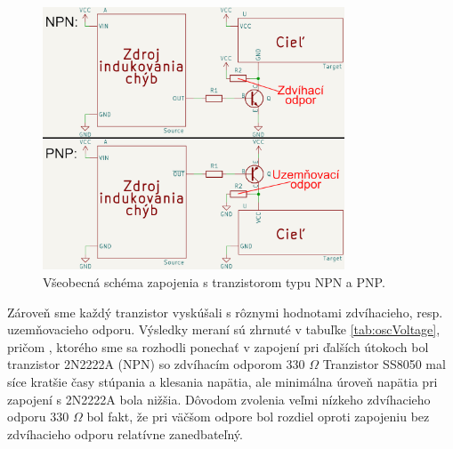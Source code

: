 \begin{figure}
    \centerline{\includegraphics[width=0.8\textwidth]{images/npnVpnp.png}}
    \caption[Všeobecná schéma zapojenia s tranzistorom typu NPN a PNP]{Všeobecná schéma zapojenia s tranzistorom typu NPN a PNP.}
    \label{obr:npnVpnp}
\end{figure}

Zároveň sme každý tranzistor vyskúšali s rôznymi hodnotami zdvíhacieho, resp. uzemňovacieho odporu. Výsledky meraní sú zhrnuté v tabuľke \ref{tab:oscVoltage}, pričom , ktorého sme sa rozhodli ponechať v zapojení pri ďalších útokoch bol tranzistor 2N2222A (NPN) so zdvíhacím odporom 330 $\Omega$ Tranzistor SS8050 mal síce kratšie časy stúpania a klesania napätia, ale minimálna úroveň napätia pri zapojení s 2N2222A bola nižšia. Dôvodom zvolenia veľmi nízkeho zdvíhacieho odporu 330 $\Omega$ bol fakt, že pri väčšom odpore bol rozdiel oproti zapojeniu bez zdvíhacieho odporu relatívne zanedbateľný.

